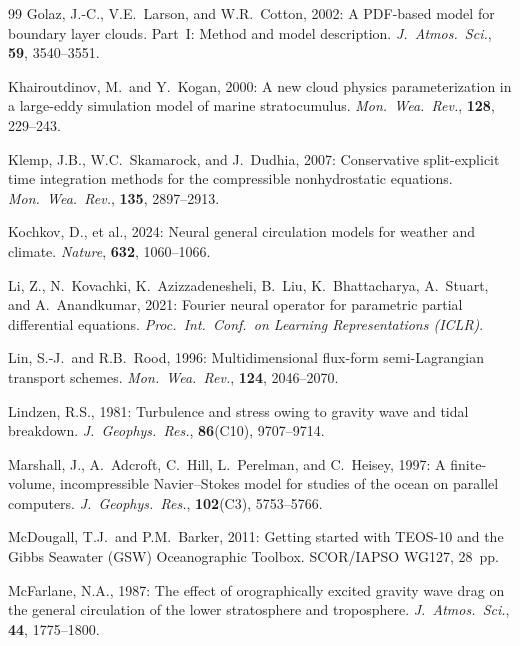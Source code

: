 \documentclass[11pt,twoside]{report}
\begin{document}
\begin{thebibliography}{99}
Golaz, J.-C., V.E.~Larson, and W.R.~Cotton, 2002:
A PDF-based model for boundary layer clouds. Part~I: Method and model
description.
\textit{J.\ Atmos.\ Sci.}, \textbf{59}, 3540--3551.

Khairoutdinov, M.\ and Y.~Kogan, 2000:
A new cloud physics parameterization in a large-eddy simulation model of
marine stratocumulus.
\textit{Mon.\ Wea.\ Rev.}, \textbf{128}, 229--243.

Klemp, J.B., W.C.~Skamarock, and J.~Dudhia, 2007:
Conservative split-explicit time integration methods for the compressible
nonhydrostatic equations.
\textit{Mon.\ Wea.\ Rev.}, \textbf{135}, 2897--2913.

Kochkov, D., et al., 2024:
Neural general circulation models for weather and climate.
\textit{Nature}, \textbf{632}, 1060--1066.

Li, Z., N.~Kovachki, K.~Azizzadenesheli, B.~Liu, K.~Bhattacharya, A.~Stuart,
and A.~Anandkumar, 2021:
Fourier neural operator for parametric partial differential equations.
\textit{Proc.\ Int.\ Conf.\ on Learning Representations (ICLR)}.

Lin, S.-J.\ and R.B.~Rood, 1996:
Multidimensional flux-form semi-Lagrangian transport schemes.
\textit{Mon.\ Wea.\ Rev.}, \textbf{124}, 2046--2070.

Lindzen, R.S., 1981:
Turbulence and stress owing to gravity wave and tidal breakdown.
\textit{J.\ Geophys.\ Res.}, \textbf{86}(C10), 9707--9714.

Marshall, J., A.~Adcroft, C.~Hill, L.~Perelman, and C.~Heisey, 1997:
A finite-volume, incompressible Navier--Stokes model for studies of the ocean
on parallel computers.
\textit{J.\ Geophys.\ Res.}, \textbf{102}(C3), 5753--5766.

McDougall, T.J.\ and P.M.~Barker, 2011:
Getting started with TEOS-10 and the Gibbs Seawater (GSW) Oceanographic
Toolbox.
SCOR/IAPSO WG127, 28~pp.

McFarlane, N.A., 1987:
The effect of orographically excited gravity wave drag on the general
circulation of the lower stratosphere and troposphere.
\textit{J.\ Atmos.\ Sci.}, \textbf{44}, 1775--1800.


\end{thebibliography}
\end{document}
